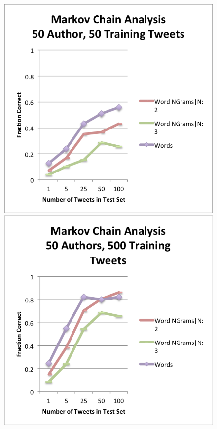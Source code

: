 \documentclass[pageno]{jpaper}
\begin{document}
\begin{figure}[h!]
\begin{center}
\includegraphics*[scale=.75]{A1}
\includegraphics*[scale=.75]{A3}

\end{center}
\end{figure}
\end{document}
